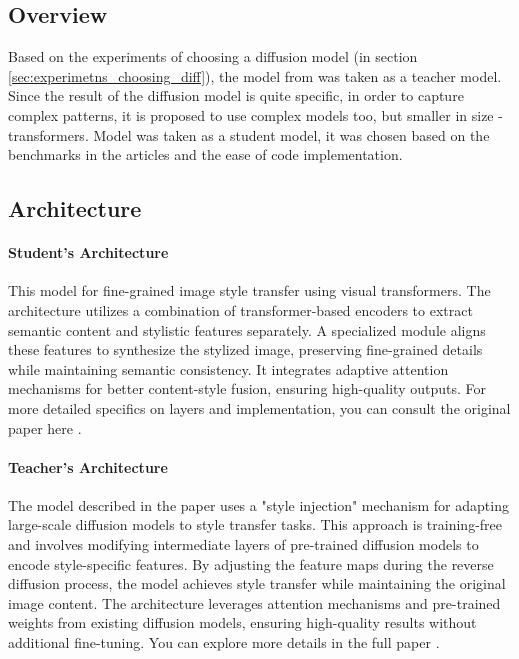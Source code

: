 \documentclass{article}
\begin{document}
\subsection{Overview}
Based on the experiments of choosing a diffusion model (in section \ref{sec:experimetns_choosing_diff}), the model from \cite{method 4} was taken as a teacher model. Since the result of the diffusion model is quite specific, in order to capture complex patterns, it is proposed to use complex models too, but smaller in size - transformers. Model \cite{method 5} was taken as a student model, it was chosen based on the benchmarks in the articles and the ease of code implementation.

\subsection{Architecture}
\paragraph{Student's Architecture} This model for fine-grained image style transfer using visual transformers. The architecture utilizes a combination of transformer-based encoders to extract semantic content and stylistic features separately. A specialized module aligns these features to synthesize the stylized image, preserving fine-grained details while maintaining semantic consistency. It integrates adaptive attention mechanisms for better content-style fusion, ensuring high-quality outputs. For more detailed specifics on layers and implementation, you can consult the original paper here \cite{method 5}.

\paragraph{Teacher's Architecture} The model described in the paper uses a "style injection" mechanism for adapting large-scale diffusion models to style transfer tasks. This approach is training-free and involves modifying intermediate layers of pre-trained diffusion models to encode style-specific features. By adjusting the feature maps during the reverse diffusion process, the model achieves style transfer while maintaining the original image content. The architecture leverages attention mechanisms and pre-trained weights from existing diffusion models, ensuring high-quality results without additional fine-tuning. You can explore more details in the full paper \cite{method 4}.
\end{document}
